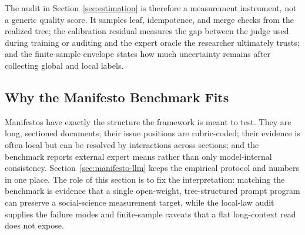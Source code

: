The audit in Section~\ref{sec:estimation} is therefore a measurement
instrument, not a generic quality score. It samples leaf, idempotence, and
merge checks from the realized tree; the calibration residual measures the
gap between the judge used during training or auditing and the expert
oracle the researcher ultimately trusts; and the finite-sample envelope
states how much uncertainty remains after collecting global and local
labels.

\subsection{Why the Manifesto Benchmark Fits}

Manifestos have exactly the structure the framework is meant to test.
They are long, sectioned documents; their issue positions are rubric-coded;
their evidence is often local but can be resolved by interactions across
sections; and the benchmark reports external expert means rather than only
model-internal consistency. Section~\ref{sec:manifesto-llm} keeps the
empirical protocol and numbers in one place. The role of this section is
to fix the interpretation: matching the benchmark is evidence that a
single open-weight, tree-structured prompt program can preserve a
social-science measurement target, while the local-law audit supplies the
failure modes and finite-sample caveats that a flat long-context read does
not expose.
